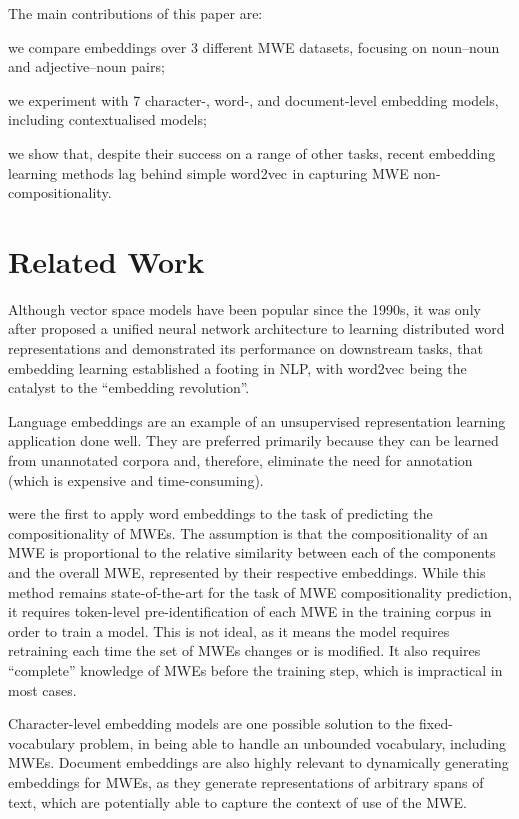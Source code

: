 \documentclass[11pt,a4paper]{article}
\newcommand{\embmethod}[2][]{\textsf{#2}$_{\text{#1}}$\xspace}
\newcommand{\wordtovec}{\embmethod{word2vec}}
\begin{document}
The main contributions of this paper are:
\begin{compactenum}[(i)]
\item we compare embeddings over 3 different MWE datasets, focusing on noun--noun and adjective--noun pairs;
\item we experiment with 7 character-, word-, and document-level embedding models, including contextualised models;
\item we show that, despite their success on a range of other tasks, recent embedding learning methods lag behind simple \wordtovec in capturing MWE non-compositionality.
\end{compactenum}

\section{Related Work}

Although vector space models have been popular since the 1990s, it was only after \citet{Coll2018} proposed a unified neural network architecture to learning distributed word representations and demonstrated its performance on downstream tasks, that embedding learning established a footing in NLP, with \wordtovec \cite{Mikolov2013} being the catalyst to the ``embedding revolution''.

Language embeddings are an example of an unsupervised representation learning application done well. They are preferred primarily because they can be learned from unannotated corpora and, therefore, eliminate the need for annotation (which is expensive and time-consuming).

\citet{Salehi2015} were the first to apply word embeddings to the task of predicting the compositionality of MWEs. The assumption is that the compositionality of an MWE is proportional to the relative similarity between each of the components and the overall MWE, represented by their respective embeddings. While this method remains state-of-the-art for the task of MWE compositionality prediction, it requires token-level pre-identification of each MWE in the training corpus in order to train a model. This is not ideal, as it means the model requires retraining each time the set of MWEs changes or is modified. It also requires ``complete'' knowledge of MWEs before the training step, which is impractical in most cases.

Character-level embedding models \cite{Hakimi2018} are one possible solution to the fixed-vocabulary problem, in being able to handle an unbounded vocabulary, including MWEs. Document embeddings \cite{Le+:2014,Conneau2017} are also highly relevant to dynamically generating embeddings for MWEs, as they generate representations of arbitrary spans of text, which are potentially able to capture the context of use of the MWE.
\end{document}
